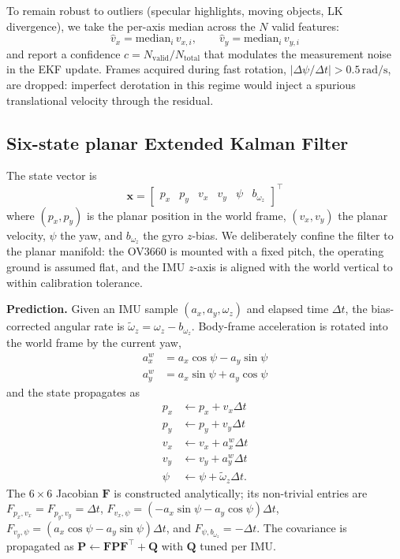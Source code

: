 \documentclass[conference]{IEEEtran}
\begin{document}
To remain robust to outliers (specular highlights, moving objects,
LK divergence), we take the per-axis median across the $N$ valid
features:
\begin{equation}
\hat{v}_x = \mathrm{median}_i\, v_{x,i}, \qquad
\hat{v}_y = \mathrm{median}_i\, v_{y,i}
\end{equation}
and report a confidence $c = N_{\text{valid}}/N_{\text{total}}$ that
modulates the measurement noise in the EKF update.  Frames acquired
during fast rotation, $|\Delta\psi/\Delta t| > 0.5\,\mathrm{rad/s}$,
are dropped: imperfect derotation in this regime would inject a
spurious translational velocity through the residual.

\subsection{Six-state planar Extended Kalman Filter}
\label{sec:ekf}
The state vector is
\begin{equation}
\mathbf{x} =
\begin{bmatrix}
p_x & p_y & v_x & v_y & \psi & b_{\omega_z}
\end{bmatrix}^\top
\end{equation}
where $(p_x, p_y)$ is the planar position in the world frame,
$(v_x, v_y)$ the planar velocity, $\psi$ the yaw, and $b_{\omega_z}$
the gyro $z$-bias.  We deliberately confine the filter to the planar
manifold: the OV3660 is mounted with a fixed pitch, the operating
ground is assumed flat, and the IMU $z$-axis is aligned with the
world vertical to within calibration tolerance.

\textbf{Prediction.}  Given an IMU sample $(a_x, a_y, \omega_z)$ and
elapsed time $\Delta t$, the bias-corrected angular rate is
$\tilde{\omega}_z = \omega_z - b_{\omega_z}$. Body-frame
acceleration is rotated into the world frame by the current yaw,
\begin{align}
a_x^{w} &= a_x \cos\psi - a_y \sin\psi \\
a_y^{w} &= a_x \sin\psi + a_y \cos\psi
\end{align}
and the state propagates as
\begin{align}
p_x &\leftarrow p_x + v_x \Delta t \\
p_y &\leftarrow p_y + v_y \Delta t \\
v_x &\leftarrow v_x + a_x^{w} \Delta t \\
v_y &\leftarrow v_y + a_y^{w} \Delta t \\
\psi &\leftarrow \psi + \tilde{\omega}_z \Delta t.
\end{align}
The $6\times 6$ Jacobian $\mathbf{F}$ is constructed analytically; its
non-trivial entries are
$F_{p_x, v_x}=F_{p_y, v_y}=\Delta t$,
$F_{v_x, \psi}=(-a_x \sin\psi - a_y \cos\psi)\Delta t$,
$F_{v_y, \psi}=( a_x \cos\psi - a_y \sin\psi)\Delta t$, and
$F_{\psi, b_{\omega_z}}=-\Delta t$.
The covariance is propagated as
$\mathbf{P} \leftarrow \mathbf{F}\mathbf{P}\mathbf{F}^\top + \mathbf{Q}$
with $\mathbf{Q}$ tuned per IMU.
\end{document}
